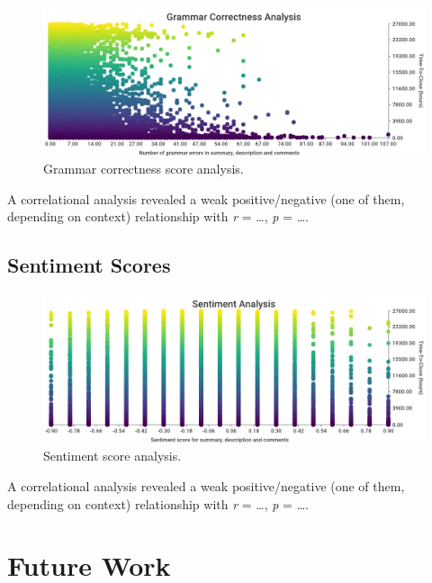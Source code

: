 \documentclass{mpaper}
\begin{document}
\begin{figure}[ht]
  \begin{center}
    \includegraphics[scale=0.23]{images/grammar_correctness.png}
  \end{center}
  \caption{\label{grammar}Grammar correctness score analysis.}
\end{figure}

A correlational analysis revealed a weak positive/negative (one of them, depending on context) relationship
with \emph{r} = \dots, \emph{p} = \dots.

\subsection{Sentiment Scores}

\begin{figure}[ht]
  \begin{center}
    \includegraphics[scale=0.23]{images/sentiment_analysis.png}
  \end{center}
  \caption{\label{sentiment}Sentiment score analysis.}
\end{figure}

A correlational analysis revealed a weak positive/negative (one of them, depending on context) relationship
with \emph{r} = \dots, \emph{p} = \dots.

\section{Future Work}\label{future_work}
\end{document}
